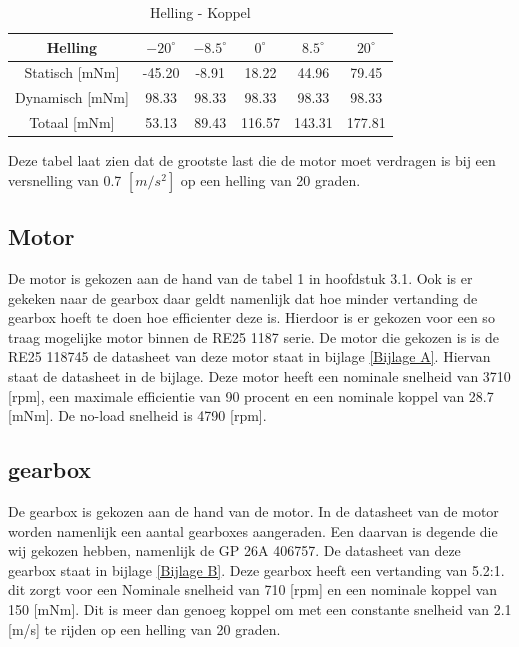 \documentclass{article}
\begin{document}
        \begin{table}[h]
            \centering
            \begin{tabular}{|c|c|c|c|c|c|}
            \hline
            Helling & $-20 ^\circ$ & $-8.5 ^\circ$ & $0 ^\circ$ & $8.5 ^\circ$ & $20 ^\circ$ \\ \hline
            Statisch [mNm]  & -45.20   & -8.91   & 18.22   & 44.96  & 79.45   \\ \hline
            Dynamisch [mNm] & 98.33    & 98.33   & 98.33   & 98.33  & 98.33  \\ \hline
            Totaal [mNm] & 53.13  & 89.43   & 116.57  & 143.31  & 177.81  \\ \hline
            \end{tabular}
            \caption{Helling - Koppel}
            \label{tab}
        \end{table}
    
    Deze tabel laat zien dat de grootste last die de motor moet verdragen is bij  een versnelling van 0.7 $[m/s^2]$ op een helling van 20 graden.
        
    \subsection{Motor}
    De motor is gekozen aan de hand van de tabel 1 in hoofdstuk 3.1. 
    Ook is er gekeken naar de gearbox daar geldt namenlijk dat hoe minder vertanding de gearbox hoeft te doen hoe efficienter deze is. 
    Hierdoor is er gekozen voor een so traag mogelijke motor binnen de RE25 1187 serie.
    De motor die gekozen is is de RE25 118745 de datasheet van deze motor staat in bijlage \ref{Bijlage A}.
    Hiervan staat de datasheet in de bijlage.
    Deze motor heeft een nominale snelheid van 3710 [rpm], een maximale efficientie van 90 procent en een nominale koppel van 28.7 [mNm].
    De no-load snelheid is 4790 [rpm].
    

    \subsection{gearbox}
    De gearbox is gekozen aan de hand van de motor. 
    In de datasheet van de motor worden namenlijk een aantal gearboxes aangeraden.
    Een daarvan is degende die wij gekozen hebben, namenlijk de GP 26A 406757. 
    De datasheet van deze gearbox staat in bijlage \ref{Bijlage B}.
    Deze gearbox heeft een vertanding van 5.2:1. dit zorgt voor een Nominale snelheid van 710 [rpm] en een nominale koppel van 150 [mNm]. 
    Dit is meer dan genoeg koppel om met een constante snelheid van 2.1 [m/s] te rijden op een helling van 20 graden.
\end{document}
